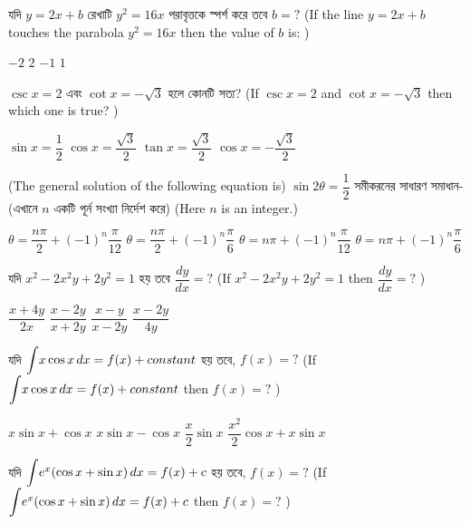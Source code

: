 \documentclass[addpoints]{exam}
\begin{document}
\begin{questions}
\question যদি $ y=2x+b $ রেখাটি $ y^{2}=16x $ পরাবৃত্তকে স্পর্শ করে তবে $ b=? $ (If the line $ y=2x+b $ touches the parabola $ y^{2}=16x $ then the value of $ b $ is: )


\begin{oneparchoices}
\choice  $ -2 $
\choice  $ 2 $
\choice  $ -1 $
\choice  $ 1 $
\end{oneparchoices}


\question $ \csc x= 2 $ এবং $ \cot x = -\sqrt{3} $ হলে কোনটি সত্য? (If $ \csc x= 2 $ and  $ \cot x = -\sqrt{3} $ then which one is true? )

\begin{oneparchoices}
\choice $ \sin x = \dfrac{1}{2} $
\choice $ \cos x = \dfrac{\sqrt{3}}{2} $
\choice $ \tan x = \dfrac{\sqrt{3}}{2} $
\choice $ \cos x =-\dfrac{\sqrt{3}}{2} $
\end{oneparchoices}

\question (The general solution of the following equation is) $ \sin 2\theta = \dfrac{1}{2} $ সমীকরনের সাধারণ সমাধান- (এখানে $ n $ একটি পূর্ন সংখ্যা নির্দেশ করে) (Here $ n $ is an integer.)

\begin{oneparchoices}
\choice $ \theta = \dfrac{n\pi}{2} +(-1)^{n}\dfrac{\pi}{12} $
\choice $ \theta = \dfrac{n\pi}{2} +(-1)^{n}\dfrac{\pi}{6} $
\choice $ \theta = n\pi +(-1)^{n}\dfrac{\pi}{12} $
\choice $ \theta = n\pi +(-1)^{n}\dfrac{\pi}{6} $
\end{oneparchoices}

\question  যদি $ x^{2}-2x^{2}y+2y^{2}=1 $ হয় তবে $ \dfrac{dy}{dx}=? $ (If $ x^{2}-2x^{2}y+2y^{2}=1 $ then $ \dfrac{dy}{dx}=? $ )

\begin{oneparchoices}
\choice $ \dfrac{x+4y}{2x} $
\choice $ \dfrac{x-2y}{x+2y} $
\choice $ \dfrac{x-y}{x-2y} $
\choice $ \dfrac{x-2y}{4y} $
\end{oneparchoices}

\question যদি $ \mathlarger{\int}x\cos x\, dx =f(x) + constant $ হয় তবে, $ f(x) =?  $ (If $ \mathlarger{\int}x\cos x\, dx =f(x) + constant $ then $ f(x) =? $ )

\begin{oneparchoices}
\choice $ x\sin x + \cos x $
\choice $ x\sin x -\cos x $
\choice $ \dfrac{x}{2}\sin x $
\choice $ \dfrac{x^{2}}{2}\cos x + x\sin x $
\end{oneparchoices}

\question যদি $ \mathlarger{\int}e^{x}(\cos x + \sin x)\, dx =f(x) + c $ হয় তবে, $ f(x) =?  $ (If $ \mathlarger{\int}e^{x}(\cos x + \sin x)\, dx =f(x) + c $ then $ f(x) =? $ )


\end{questions}
\end{document}
